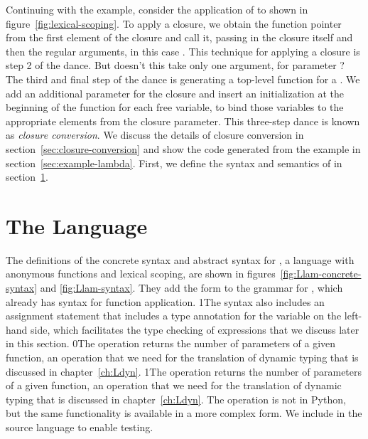 \documentclass[7x10]{TimesAPriori_MIT}%
\def\racketEd{0}
\def\pythonEd{1}
\def\edition{1}
\newcommand{\racket}[1]{{\if\edition\racketEd{#1}\fi}}
\newcommand{\pythonColor}[0]{}
\newcommand{\python}[1]{{\if\edition\pythonEd\pythonColor #1\fi}}
\numberwithin{theorem}{chapter}
\numberwithin{definition}{chapter}
\numberwithin{equation}{chapter}
\begin{document}
Continuing with the example, consider the application of  to
 shown in figure~\ref{fig:lexical-scoping}.  To apply a
closure, we obtain the function pointer from the first element of the
closure and call it, passing in the closure itself and then the
regular arguments, in this case . This technique for applying
a closure is step 2 of the dance.
%
But doesn't this  take only one argument, for parameter
? The third and final step of the dance is generating a
top-level function for a .  We add an additional
parameter for the closure and insert an initialization at the beginning
of the function for each free variable, to bind those variables to the
appropriate elements from the closure parameter.
%
This three-step dance is known as \emph{closure
  conversion}. We discuss the
details of closure conversion in section~\ref{sec:closure-conversion}
and show the code generated from the example in
section~\ref{sec:example-lambda}. First, we define the syntax and
semantics of \LangLam{} in section~\ref{sec:r5}.

\section{The \LangLam{} Language}
\label{sec:r5}

The definitions of the concrete syntax and abstract syntax for
\LangLam{}, a language with anonymous functions and lexical scoping,
are shown in figures~\ref{fig:Llam-concrete-syntax} and
\ref{fig:Llam-syntax}. They add the  form to the grammar
for \LangFun{}, which already has syntax for function application.
%
\python{The syntax also includes an assignment statement that includes
  a type annotation for the variable on the left-hand side, which
  facilitates the type checking of \code{lambda} expressions that we
  discuss later in this section.}
%
\racket{The  operation returns the number of parameters
  of a given function, an operation that we need for the translation
  of dynamic typing that is discussed in chapter~\ref{ch:Ldyn}.}
%
\python{The  operation returns the number of parameters of
  a given function, an operation that we need for the translation
  of dynamic typing that is discussed in chapter~\ref{ch:Ldyn}.
  The \code{arity} operation is not in Python, but the same functionality
  is available in a more complex form. We include \code{arity} in the
  \LangLam{} source language to enable testing.}
\end{document}
